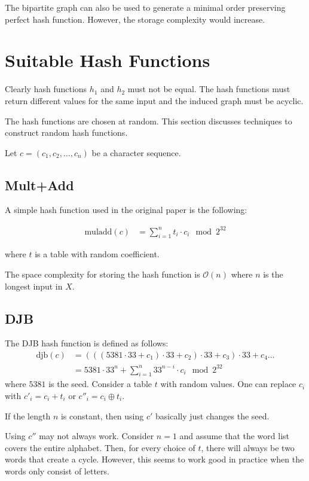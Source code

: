 \documentclass{article}
\newcommand{\xor}{\oplus}
\newcommand{\djb}{\mathrm{djb}}
\newcommand{\muladd}{\mathrm{muladd}}
\newcommand{\OO}{\mathcal{O}}
\begin{document}
The bipartite graph can also be used to generate a minimal order preserving 
perfect hash function. However, the storage complexity would increase.


\section{Suitable Hash Functions}

Clearly hash functions $h_1$ and $h_2$ must not be equal.
The hash functions must return different values for the
same input and the induced graph must be acyclic.

The hash functions are chosen at random. This section
discusses techniques to construct random hash functions.

Let $c=(c_1, c_2, \ldots, c_n)$ be a character sequence.

\subsection{Mult+Add}

A simple hash function used in the original paper is the following:

\begin{align*}
\muladd(c) &= \sum_{i=1}^n t_i \cdot c_i \mod 2^{32}
\end{align*}

where $t$ is a table with random coefficient.

The space complexity for storing the hash function is $\OO(n)$ where
$n$ is the longest input in $X$.


\subsection{DJB}

The DJB hash function is defined as follows:
\begin{align*}
\djb(c) &= (((5381\cdot 33+c_1)\cdot 33+c_2)\cdot 33+c_3)\cdot 33+c_4 \ldots\\
    &= 5381\cdot 33^n + \sum_{i=1}^n 33^{n-i}\cdot c_i \mod 2^{32}
\end{align*}
where $5381$ is the seed.
Consider a table $t$ with random values.
One can replace $c_i$ with $c'_i=c_i+t_i$ or $c''_i=c_i\xor t_i$.

If the length $n$ is constant, then using $c'$ basically just changes the seed.

Using $c''$ may not always work. Consider $n=1$ and assume that the word list
covers the entire alphabet. Then, for every choice of $t$, there will always
be two words that create a cycle. However, this seems to work good in practice
when the words only consist of letters.
\end{document}
